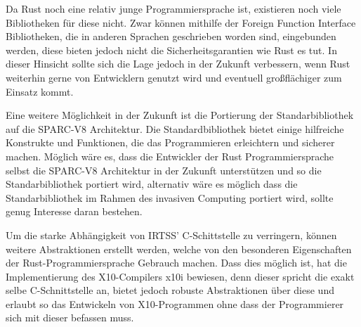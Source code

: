 Da Rust noch eine relativ junge Programmiersprache ist, existieren noch viele Bibliotheken für diese nicht. Zwar können mithilfe
der Foreign Function Interface Bibliotheken, die in anderen Sprachen geschrieben worden sind, eingebunden werden, diese bieten jedoch
nicht die Sicherheitsgarantien wie Rust es tut. In dieser Hinsicht sollte sich die Lage jedoch in der Zukunft verbessern, wenn Rust
weiterhin gerne von Entwicklern genutzt wird und eventuell großflächiger zum Einsatz kommt.

Eine weitere Möglichkeit in der Zukunft ist die Portierung der Standarbibliothek auf die SPARC-V8 Architektur. Die Standardbibliothek
bietet einige hilfreiche Konstrukte und Funktionen, die das Programmieren erleichtern und sicherer machen. Möglich wäre es, dass die 
Entwickler der Rust Programmiersprache selbst die SPARC-V8 Architektur in der Zukunft unterstützen und so die
Standarbibliothek portiert wird, alternativ wäre es möglich dass die Standarbibliothek im Rahmen des invasiven Computing
portiert wird, sollte genug Interesse daran bestehen.

Um die starke Abhängigkeit von IRTSS' C-Schittstelle zu verringern, können weitere Abstraktionen erstellt werden, welche von den
besonderen Eigenschaften der Rust-Programmiersprache Gebrauch machen. Dass dies möglich ist, hat die Implementierung des X10-Compilers
x10i bewiesen, denn dieser spricht die exakt selbe C-Schnittstelle an, bietet jedoch robuste Abstraktionen über diese und erlaubt so
das Entwickeln von X10-Programmen ohne dass der Programmierer sich mit dieser befassen muss.
